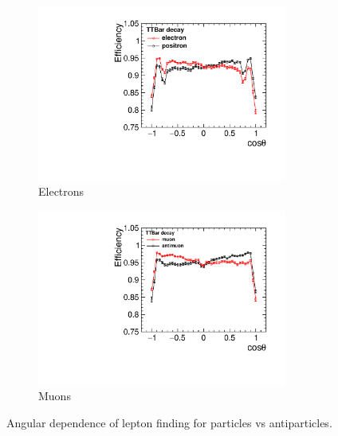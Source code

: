 \begin{figure}
  \centering
  \begin{subfigure}{.5\textwidth}
    \centering
    \includegraphics[width=0.9\textwidth]{TopAnalysis/figures/ElectronEfficiencys.pdf}
    \caption[Charge Tagging Efficiency]{Electrons}
    \label{fig:electronefficiency}
  \end{subfigure}%
  \begin{subfigure}{.5\textwidth}
    \centering
    \includegraphics[width=0.9\textwidth]{TopAnalysis/figures/MuonEfficiencys.pdf}
    \caption[Charge Tagging Efficiency]{Muons}
    \label{fig:muonefficiency}
  \end{subfigure}
  \caption{Angular dependence of lepton finding for particles vs antiparticles.}
  \label{fig:chargeEfficiencies}
\end{figure}

